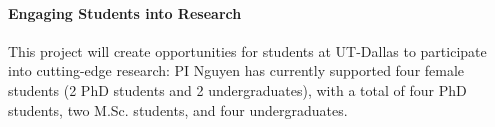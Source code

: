 \paragraph{Engaging Students into Research}

This project will create opportunities for students at UT-Dallas to
participate into cutting-edge research: PI Nguyen has currently supported
four female students (2 PhD students and 2 undergraduates), with a total
of four PhD students, two M.Sc. students, and four undergraduates.



%

